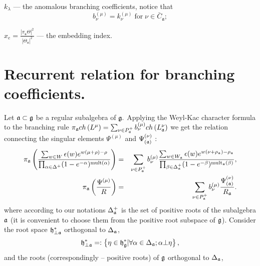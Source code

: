 \documentclass[12pt]{iopart}
\theoremstyle{definition}
\begin{document}
 $k_{\lambda}$ --- the anomalous branching coefficients, notice that
\begin{equation}
  b^{(\mu)}_{\nu}=k^{(\mu)}_{\nu} \; \mbox{for} \; \nu\in \bar{C}_{\mathfrak{a}};
\label{eq:21-1}
\end{equation}

$x_e=\frac{\left|\pi_{\mathfrak{a}} \Theta\right|^2}{\left|\Theta_{\mathfrak{a}}\right|^2}$ --- the embedding index.

\section{Recurrent relation for branching coefficients.}
\label{sec:recurr-form-branch}

Let $\frak{a}\subset \frak{g}$ be a regular subalgebra of $\frak{g.}$
Applying the Weyl-Kac character formula to the branching rule $\pi _{\frak{a}%
}ch\left( L^{\mu }\right) =\sum_{\nu \in P_{\frak{a}}^{+}}b_{\nu }^{(\mu
)}ch\left( L_{\frak{a}}^{\nu }\right) $ we get the relation connecting the
singular elements $\Psi ^{\left( \mu \right) }$ and $\Psi _{\left( \frak{a}%
\right) }^{\left( \nu \right) }$ :
\begin{eqnarray}
\pi _{\frak{a}}\left( \frac{\sum_{w \in W}\epsilon (w )e^{w
(\mu +\rho )-\rho }}{\prod_{\alpha \in \Delta ^{+}}(1-e^{-\alpha })^{\mathrm{%
mult}(\alpha )}}\right) &=&\sum_{\nu \in P_{\frak{a}}^{+}}b_{\nu }^{(\mu )}%
\frac{\sum_{w \in W_{\frak{a}}}\epsilon (w )e^{w (\nu +\rho _{%
\frak{a}})-\rho _{\frak{a}}}}{\prod_{\beta \in \Delta _{\frak{a}%
}^{+}}(1-e^{-\beta })^{\mathrm{mult}_{\frak{a}}(\beta )}},  \label{eq:4} \\
\pi _{\frak{a}}\left( \frac{\Psi ^{\left( \mu \right) }}{R}\right)
&=&\sum_{\nu \in P_{\frak{a}}^{+}}b_{\nu }^{(\mu )}\frac{\Psi _{\left( \frak{%
a}\right) }^{\left( \nu \right) }}{R_{\frak{a}}}.
\end{eqnarray}
where according to our notations $\Delta _{\frak{a}}^{+}$ is the set of
positive roots of the subalgebra $\frak{a}$ (it is convenient to choose them
from the positive root subspace of $\frak{g}$). Consider the root space $%
\frak{h}_{\perp \frak{a}}^{\ast }$ orthogonal to $\Delta _{\frak{a}}$,
\begin{equation*}
\frak{h}_{\perp \frak{a}}^{\ast }=:\left\{ \eta \in \frak{h}_{\frak{g}%
}^{\ast }|\forall \alpha \in \Delta _{\frak{a}};\alpha \bot \eta \right\} ,
\end{equation*}
and the roots (correspondingly -- positive roots) of $\frak{g}$ orthogonal
to $\Delta _{\frak{a}}$,
\end{document}
